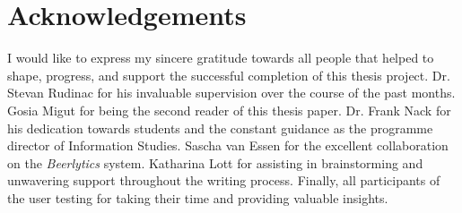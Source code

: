 \section*{Acknowledgements}
I would like to express my sincere gratitude towards all people that helped to shape, progress, and support the successful completion of this thesis project.
Dr. Stevan Rudinac for his invaluable supervision over the course of the past months.
Gosia Migut for being the second reader of this thesis paper.
Dr. Frank Nack for his dedication towards students and the constant guidance as the programme director of Information Studies.
Sascha van Essen for the excellent collaboration on the \textit{Beerlytics} system.
Katharina Lott for assisting in brainstorming and unwavering support throughout the writing process.
Finally, all participants of the user testing for taking their time and providing valuable insights.